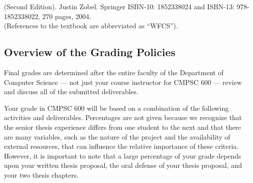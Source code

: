 \documentclass[11pt]{article}
\begin{document}
 (Second Edition).  Justin Zobel.
Springer ISBN-10: 1852338024 and ISBN-13: 978-1852338022, 270 pages, 2004. \\
(References to the textbook are abbreviated as ``WFCS'').

\subsection*{Overview of the Grading Policies}

Final grades are determined after the entire faculty of the Department of
Computer Science --- not just your course instructor for CMPSC 600 --- review
and discuss all of the submitted deliverables.

Your grade in CMPSC 600 will be based on a combination of the following
activities and deliverables. Percentages are not given because we recognize that
the senior thesis experience differs from one student to the next and that there
are many variables, such as the nature of the project and the availability of
external resources, that can influence the relative importance of these
criteria. However, it is important to note that a large percentage of your grade
depends upon your written thesis proposal, the oral defense of your thesis
proposal, and your two thesis chapters.
\end{document}
